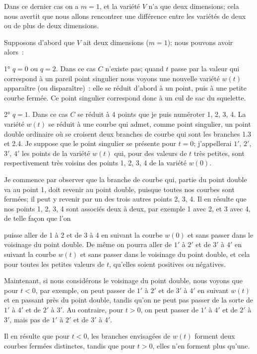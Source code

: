 \documentclass{article}
\begin{document}
Dans ce dernier cas on a $m = 1$, et la variété $V$ n'a que deux dimensions; cela nous avertit que nous allons rencontrer une différence entre les variétés de deux ou de plus de deux dimensions.

Supposons d'abord que $V$ ait deux dimensions ($m = 1$); nous pouvons avoir alors~:

1° $q = 0$ ou $q = 2$. Dans ce cas $C$ n'existe pas; quand $t$ passe par la valeur qui correspond à un pareil point singulier nous voyons une nouvelle variété $w(t)$ apparaître (ou disparaître)~: elle se réduit d'abord à un point, puis à une petite courbe fermée. Ce point singulier correspond donc à un cul de sac du squelette.

2° $q = 1$. Dans ce cas $C$ se réduit à 4 points que je puis numéroter 1, 2, 3, 4. La variété $w(t)$ se réduit à une courbe qui admet, comme point singulier, un point double ordinaire où se croisent deux branches de courbe qui sont les branches 1.3 et 2.4. Je suppose que le point singulier se présente pour $t = 0$; j'appellerai $1'$, $2'$, $3'$, $4'$ les points de la variété $w(t)$ qui, pour des valeurs de $t$ très petites, sont respectivement très voisins des points 1, 2, 3, 4 de la variété $w(0)$.

Je commence par observer que la branche de courbe qui, partie du point double va au point 1, doit revenir au point double, puisque toutes nos courbes sont fermées; il peut y revenir par un des trois autres points 2, 3, 4. Il en résulte que nos points 1, 2, 3, 4 sont associés deux à deux, par exemple 1 avec 2, et 3 avec 4, de telle façon que l'on

puisse aller de 1 à 2 et de 3 à 4 en suivant la courbe $w(0)$ et sans passer dans le voisinage du point double. De même on pourra aller de $1'$ à $2'$ et de $3'$ à $4'$ en suivant la courbe $w(t)$ et sans passer dans le voisinage du point double, et cela pour toutes les petites valeurs de $t$, qu'elles soient positives ou négatives.

Maintenant, si nous considérons le voisinage du point double, nous voyons que pour $t < 0$, par exemple, on peut passer de $1'$ à $2'$ et de $3'$ à $4'$ en suivant $w(t)$ et en passant près du point double, tandis qu'on ne peut pas passer de la sorte de $1'$ à $4'$ et de $2'$ à $3'$. Au contraire, pour $t > 0$, on peut passer de $1'$ à $4'$ et de $2'$ à $3'$, mais pas de $1'$ à $2'$ et de $3'$ à $4'$.

Il en résulte que pour $t < 0$, les branches envisagées de $w(t)$ forment deux courbes fermées distinctes, tandis que pour $t > 0$, elles n'en forment plus qu'une.
\end{document}

